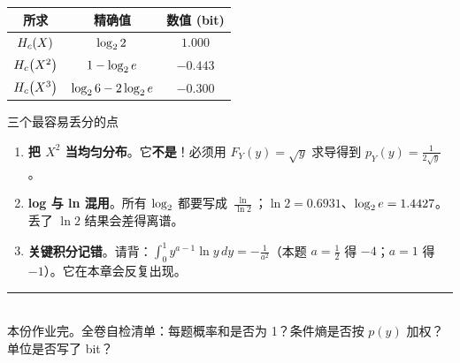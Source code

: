 \documentclass[11pt,a4paper]{ctexart}
\begin{document}
\begin{center}
\renewcommand{\arraystretch}{1.35}
\begin{tabular}{c|c|c}
\toprule
所求 & 精确值 & 数值 (bit)\\
\midrule
$H_{c}\!\left(X\right)$ & $\log_{2}2$ & $1.000$\\
$H_{c}\!\left(X^2\right)$ & $1-\log_{2} e$ & $-0.443$\\
$H_{c}\!\left(X^3\right)$ & $\log_{2}6-2\log_{2} e$ & $-0.300$\\
\bottomrule
\end{tabular}
\end{center}

\begin{qa}{三个最容易丢分的点}
\begin{enumerate}[leftmargin=1.6em,itemsep=1pt,topsep=2pt]
  \item \textbf{把 $X^2$ 当均匀分布}。它\textbf{不是}！必须用 $F_Y(y)=\sqrt y$ 求导得到 $p_Y(y)=\frac{1}{2\sqrt y}$。
  \item \textbf{log 与 ln 混用}。所有 $\log_{2}$ 都要写成 $\frac{\ln}{\ln2}$；$\ln2=0.6931$、$\log_{2} e=1.4427$。丢了 $\ln 2$ 结果会差得离谱。
  \item \textbf{关键积分记错}。请背：$\displaystyle\int_0^1 y^{a-1}\ln y\,dy=-\frac{1}{a^2}$（本题 $a=\frac12$ 得 $-4$；$a=1$ 得 $-1$）。它在本章会反复出现。
\end{enumerate}
\end{qa}

\vspace{4pt}
\begin{center}
\rule{0.9\textwidth}{0.4pt}\\[2pt]
{\small 本份作业完。全卷自检清单：每题概率和是否为 1？条件熵是否按 $p(y)$ 加权？单位是否写了 bit？}
\end{center}
\end{document}
